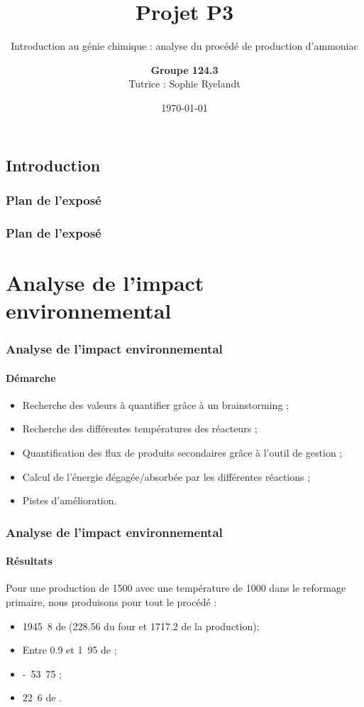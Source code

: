\documentclass{beamer}
\title{Projet P3}
\subtitle{Introduction au génie chimique : analyse du procédé de production d'ammoniac}
\author{\textbf{Groupe 124.3}\\
Tutrice : Sophie Ryelandt}
\institute{Ecole Polytechnique de Louvain}
\date{\today}
\begin{document}
 
 
	\begin{frame} 
		\titlepage 
	\end{frame} 
	
	\begin{frame}
		\section{Introduction}
		\frametitle{Plan de l'exposé}
		\tableofcontents[currentsubsection,sectionstyle=show/shaded,subsectionstyle=show/shaded/hide]
	\end{frame}
	
	\begin{frame}
		\frametitle{Plan de l'exposé}
		\section{Analyse de l'impact environnemental}
		\tableofcontents[currentsubsection,sectionstyle=show/shaded,subsectionstyle=show/shaded/hide]
	\end{frame}
	
	\begin{frame}
	\frametitle{Analyse de l'impact environnemental}
	\framesubtitle{Démarche}
	\begin{itemize}
		\item Recherche des valeurs à quantifier grâce à un brainstorming ;
		\item Recherche des différentes températures des réacteurs ;
		\item Quantification des flux de produits secondaires grâce à l'outil de gestion ;
		\item Calcul de l'énergie dégagée/absorbée par les différentes réactions ;
		\item Pistes d'amélioration.
	\end{itemize}
	\end{frame}

	\begin{frame}
	\frametitle{Analyse de l'impact environnemental}
	\framesubtitle{Résultats}
	Pour une production de \unit{1500}{\ton\per\dday} avec une température 
	de \unit{1000}{\kelvin} dans le reformage primaire, nous produisons pour tout le procédé :
	\begin{itemize}
		\item \unit{1945.8}{\ton\per\dday} de  (228.56 du four et 1717.2 de la production);
		\item Entre 0.9 et \unit{1.95}{\ton\per\dday} de  \cite{nitrogen_issue} ;
		\item \unit{-53.75}{\kilo\joule\per\dday} ;
		\item \unit{22.6}{\ton\per\dday} de \chemform{Ar}.
	\end{itemize}
	\end{frame}
\end{document}

